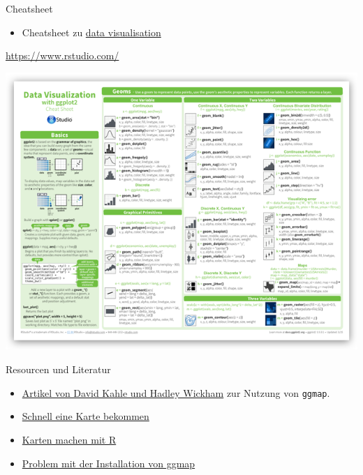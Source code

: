 \documentclass[ignorenonframetext,]{beamer}
\providecommand{\tightlist}{%
  \setlength{\itemsep}{0pt}\setlength{\parskip}{0pt}}
\begin{document}
\begin{frame}{Cheatsheet}
\protect\hypertarget{cheatsheet}{}

\begin{itemize}
\tightlist
\item
  Cheatsheet zu
  \href{https://www.rstudio.com/wp-content/uploads/2015/04/ggplot2-cheatsheet.pdf}{data
  visualisation}
\end{itemize}

\url{https://www.rstudio.com/}

\includegraphics{figure/ggplot2-cheatsheet.png}

\end{frame}

\begin{frame}[fragile]{Resourcen und Literatur}
\protect\hypertarget{resourcen-und-literatur}{}

\begin{itemize}
\item
  \href{http://journal.r-project.org/archive/2013-1/kahle-wickham.pdf}{Artikel
  von David Kahle und Hadley Wickham} zur Nutzung von \texttt{ggmap}.
\item
  \href{http://rpackages.ianhowson.com/cran/ggmap/man/get_map.html}{Schnell
  eine Karte bekommen}
\item
  \href{http://www.kevjohnson.org/making-maps-in-r-part-2/}{Karten
  machen mit R}
\item
  \href{http://stackoverflow.com/questions/40642850/ggmap-error-geomrasterann-was-built-with-an-incompatible-version-of-ggproto}{Problem
  mit der Installation von ggmap}
\end{itemize}

\end{frame}
\end{document}
